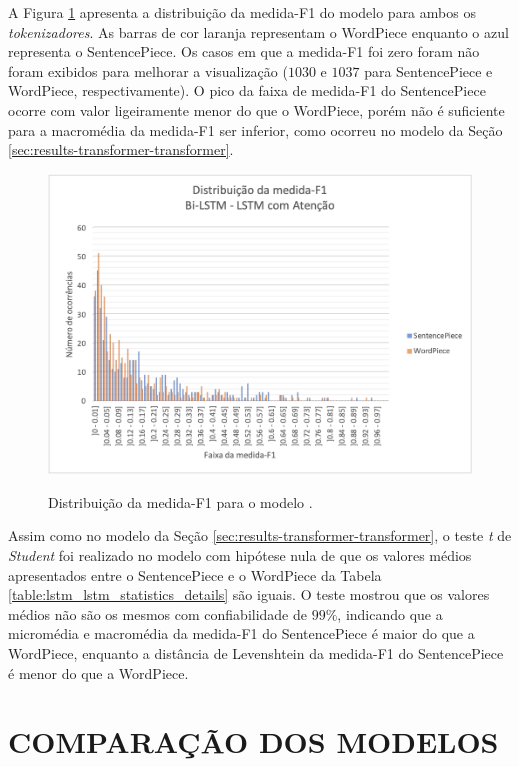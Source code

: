 A Figura \ref{fig:result_f1_range_lstm} apresenta a distribuição da medida-F1 do modelo para ambos os \textit{tokenizadores}. As barras de cor laranja representam o WordPiece enquanto o azul representa o SentencePiece. Os casos em que a medida-F1 foi zero foram não foram exibidos para melhorar a visualização ($1030$ e $1037$ para SentencePiece e WordPiece, respectivamente). O pico da faixa de medida-F1 do SentencePiece ocorre com valor ligeiramente menor do que o WordPiece, porém não é suficiente para a macromédia da medida-F1 ser inferior, como ocorreu no modelo \xfmrxfmr{} da Seção \ref{sec:results-transformer-transformer}.
\begin{figure}[htbp]
    \centering
        \caption{Distribuição da medida-F1 para o modelo \lstmlstm{}.}
        \includegraphics[width=\textwidth]{resources/images/results/result_F1_range_lstm_ptbr.png}
        \label{fig:result_f1_range_lstm}
\end{figure}

Assim como no modelo \xfmrxfmr{} da Seção \ref{sec:results-transformer-transformer}, o teste \textit{t} de \textit{Student} foi realizado no modelo \lstmlstm{} com hipótese nula de que os valores médios apresentados entre o SentencePiece e o WordPiece da Tabela \ref{table:lstm_lstm_statistics_details} são iguais. O teste mostrou que os valores médios não são os mesmos com confiabilidade de $99\%$, indicando que a micromédia e macromédia da medida-F1 do SentencePiece é maior do que a WordPiece, enquanto a distância de Levenshtein da medida-F1 do SentencePiece é menor do que a WordPiece.

\section{COMPARAÇÃO DOS MODELOS}
\label{sec:results-models-comparison}

